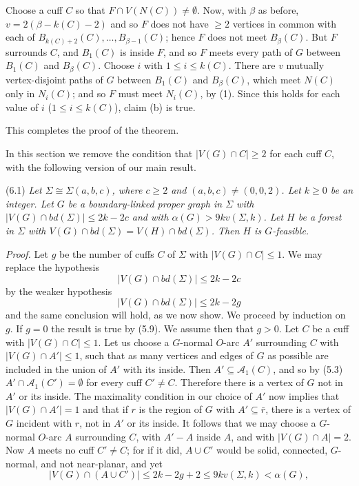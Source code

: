 Choose a cuff $C$ so that $F \cap V(N(C)) \ne \emptyset$. Now, with $\beta$ as before, $v = 2(\beta - k(C) - 2)$ and so $F$ does not have $\ge 2$ vertices in common with each of $B_{k(C)+2}(C), \dots, B_{\beta-1}(C)$; hence $F$ does not meet $B_\beta(C)$. But $F$ surrounds $C$, and $B_1(C)$ is inside $F$, and so $F$ meets every path of $G$ between $B_1(C)$ and $B_\beta(C)$. Choose $i$ with $1 \le i \le k(C)$. There are $v$ mutually vertex-disjoint paths of $G$ between $B_1(C)$ and $B_\beta(C)$, which meet $N(C)$ only in $N_i(C)$; and so $F$ must meet $N_i(C)$, by (1). Since this holds for each value of $i$ ($1 \le i \le k(C)$), claim (b) is true.

This completes the proof of the theorem.


In this section we remove the condition that $|V(G) \cap C| \ge 2$ for each cuff $C$, with the following version of our main result.

\stmt
(6.1) \textit{Let $\Sigma \cong \Sigma(a, b, c)$, where $c \ge 2$ and $(a, b, c) \ne (0, 0, 2)$. Let $k \ge 0$ be an integer. Let $G$ be a boundary-linked proper graph in $\Sigma$ with $|V(G) \cap bd(\Sigma)| \le 2k - 2c$ and with $\alpha(G) > 9kv(\Sigma, k)$. Let $H$ be a forest in $\Sigma$ with $V(G) \cap bd(\Sigma) = V(H) \cap bd(\Sigma)$. Then $H$ is $G$-feasible.}

\textit{Proof.} Let $g$ be the number of cuffs $C$ of $\Sigma$ with $|V(G) \cap C| \le 1$. We may replace the hypothesis
\begin{equation*}
|V(G) \cap bd(\Sigma)| \le 2k - 2c
\end{equation*}
by the weaker hypothesis
\begin{equation*}
|V(G) \cap bd(\Sigma)| \le 2k - 2g
\end{equation*}
and the same conclusion will hold, as we now show. We proceed by induction on $g$. If $g = 0$ the result is true by (5.9). We assume then that $g > 0$. Let $C$ be a cuff with $|V(G) \cap C| \le 1$. Let us choose a $G$-normal $O$-arc $A'$ surrounding $C$ with $|V(G) \cap A'| \le 1$, such that as many vertices and edges of $G$ as possible are included in the union of $A'$ with its inside. Then $A' \subseteq \mathcal{A}_1(C)$, and so by (5.3) $A' \cap \mathcal{A}_1(C') = \emptyset$ for every cuff $C' \ne C$. Therefore there is a vertex of $G$ not in $A'$ or its inside. The maximality condition in our choice of $A'$ now implies that $|V(G) \cap A'| = 1$ and that if $r$ is the region of $G$ with $A' \subseteq \bar{r}$, there is a vertex of $G$ incident with $r$, not in $A'$ or its inside. It follows that we may choose a $G$-normal $O$-arc $A$ surrounding $C$, with $A' - A$ inside $A$, and with $|V(G) \cap A| = 2$. Now $A$ meets no cuff $C' \ne C$; for if it did, $A \cup C'$ would be solid, connected, $G$-normal, and not near-planar, and yet
\begin{equation*}
|V(G) \cap (A \cup C')| \le 2k - 2g + 2 \le 9kv(\Sigma, k) < \alpha(G),
\end{equation*}
